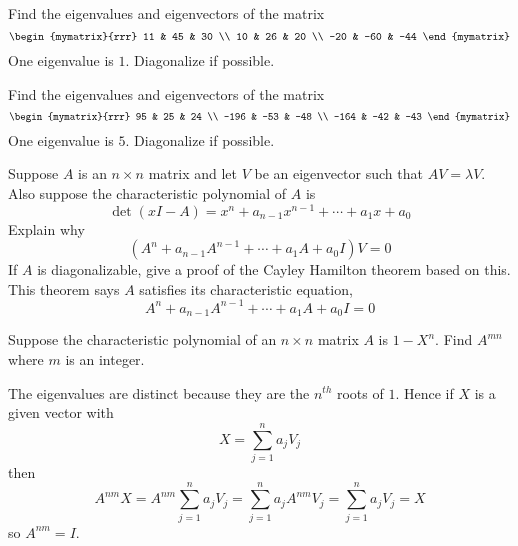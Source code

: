 \begin{enumialphparenastyle}
\begin{ex} Find the eigenvalues and eigenvectors of the matrix 
\begin{equation*}
\begin{mymatrix}{rrr}
11 & 45 & 30 \\
10 & 26 & 20 \\
-20 & -60 & -44
\end{mymatrix}
\end{equation*}
One eigenvalue is $1.$ Diagonalize if possible.
\end{ex}

\begin{ex} Find the eigenvalues and eigenvectors of the matrix  
\begin{equation*}
\begin{mymatrix}{rrr}
95 & 25 & 24 \\
-196 & -53 & -48 \\
-164 & -42 & -43
\end{mymatrix}
\end{equation*}
One eigenvalue is $5.$ Diagonalize if possible.
\end{ex}

\begin{ex} Suppose $A$ is an $n\times n$ matrix and let $V$ be an
eigenvector such that $AV=\lambda V$. Also suppose the
characteristic polynomial of $A$ is
\begin{equation*}
\det \left( x I-A\right) =x ^{n}+a_{n-1} x ^{n-1}+\cdots
+a_{1}x +a_{0}
\end{equation*}
Explain why
\begin{equation*}
\left( A^{n}+a_{n-1}A^{n-1}+\cdots +a_{1}A+a_{0}I\right) V=0
\end{equation*}
If $A$ is diagonalizable, give a proof of the Cayley Hamilton
theorem based on this. This theorem says $A$ satisfies its
characteristic equation,
\begin{equation*}
A^{n}+a_{n-1}A^{n-1}+\cdots +a_{1}A+a_{0}I=0
\end{equation*} 
\end{ex}

\begin{ex} Suppose the characteristic polynomial of an $n\times n$ matrix $A$ is 
$1-X ^{n}$. Find $A^{mn}$ where $m$ is an integer. 
\begin{sol}
The eigenvalues are distinct because
they are the $n^{th}$ roots of $1$. Hence if $X$ is a given vector with
\[
X=\sum_{j=1}^{n}a_{j}V_{j}
\]
then
\[
A^{nm}X=A^{nm}\sum_{j=1}^{n}a_{j}V_{j}=
\sum_{j=1}^{n}a_{j}A^{nm}V_{j}=\sum_{j=1}^{n}a_{j}V_{j}=X
\]
so $A^{nm}=I$.
\end{sol}
\end{ex}

\end{enumialphparenastyle}